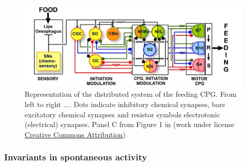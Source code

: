\begin{figure}[bth!]
	\centering
	\includegraphics[width=\textwidth]{img/invariants/distributed_benjamin_2012.pdf}
	\caption{Representation of the distributed system of the feeding CPG. From left to right .... Dots indicate inhibitory chemical synapses, bars excitatory chemical synapses and resistor symbols electrotonic (electrical) synapses. Panel C from Figure 1 in \cite{benjamin_distributed_2012} (work under license \href{http://creativecommons.org/licenses/by/2.0}{Creative Commons Attribution})}
	\label{fig:feeding distribution}
\end{figure}






\subsubsection{Invariants in spontaneous activity}

